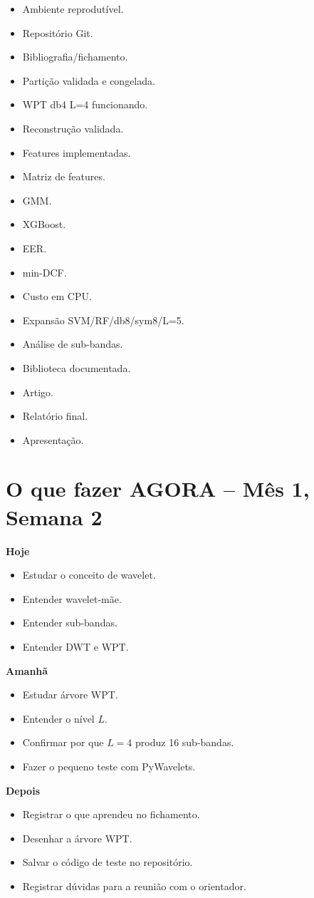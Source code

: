 \documentclass[12pt,a4paper]{article}
\begin{document}
\begin{itemize}[label=$\square$]
\item Ambiente reprodutível.
\item Repositório Git.
\item Bibliografia/fichamento.
\item Partição validada e congelada.
\item WPT db4 L=4 funcionando.
\item Reconstrução validada.
\item Features implementadas.
\item Matriz de features.
\item GMM.
\item XGBoost.
\item EER.
\item min-DCF.
\item Custo em CPU.
\item Expansão SVM/RF/db8/sym8/L=5.
\item Análise de sub-bandas.
\item Biblioteca documentada.
\item Artigo.
\item Relatório final.
\item Apresentação.
\end{itemize}

\section{O que fazer AGORA -- Mês 1, Semana 2}

\textbf{Hoje}
\begin{itemize}
\item Estudar o conceito de wavelet.
\item Entender wavelet-mãe.
\item Entender sub-bandas.
\item Entender DWT e WPT.
\end{itemize}

\textbf{Amanhã}
\begin{itemize}
\item Estudar árvore WPT.
\item Entender o nível $L$.
\item Confirmar por que $L=4$ produz 16 sub-bandas.
\item Fazer o pequeno teste com PyWavelets.
\end{itemize}

\textbf{Depois}
\begin{itemize}
\item Registrar o que aprendeu no fichamento.
\item Desenhar a árvore WPT.
\item Salvar o código de teste no repositório.
\item Registrar dúvidas para a reunião com o orientador.
\end{itemize}
\end{document}
